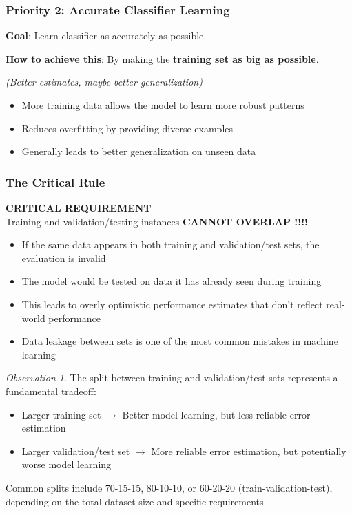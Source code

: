 \documentclass[11pt,a4paper]{article}
\theoremstyle{definition}
\theoremstyle{plain}
\theoremstyle{remark}
\newtheorem*{observation}{Observation}
\begin{document}
\subsubsection{Priority 2: Accurate Classifier Learning}

\textbf{Goal}: Learn classifier as accurately as possible.

\textbf{How to achieve this}: By making the \textbf{training set as big as possible}.

\textit{(Better estimates, maybe better generalization)}

\begin{itemize}
    \item More training data allows the model to learn more robust patterns
    \item Reduces overfitting by providing diverse examples
    \item Generally leads to better generalization on unseen data
\end{itemize}

\subsubsection{The Critical Rule}

\begin{center}
\colorbox{red!20}{\parbox{0.9\textwidth}{
\centering
\textbf{CRITICAL REQUIREMENT}\\[0.3cm]
Training and validation/testing instances \textbf{CANNOT OVERLAP !!!!}
}}
\end{center}

\begin{itemize}
    \item If the same data appears in both training and validation/test sets, the evaluation is invalid
    \item The model would be tested on data it has already seen during training
    \item This leads to overly optimistic performance estimates that don't reflect real-world performance
    \item Data leakage between sets is one of the most common mistakes in machine learning
\end{itemize}

\begin{observation}
The split between training and validation/test sets represents a fundamental tradeoff:
\begin{itemize}
    \item Larger training set $\rightarrow$ Better model learning, but less reliable error estimation
    \item Larger validation/test set $\rightarrow$ More reliable error estimation, but potentially worse model learning
\end{itemize}

Common splits include 70-15-15, 80-10-10, or 60-20-20 (train-validation-test), depending on the total dataset size and specific requirements.
\end{observation}
\end{document}
